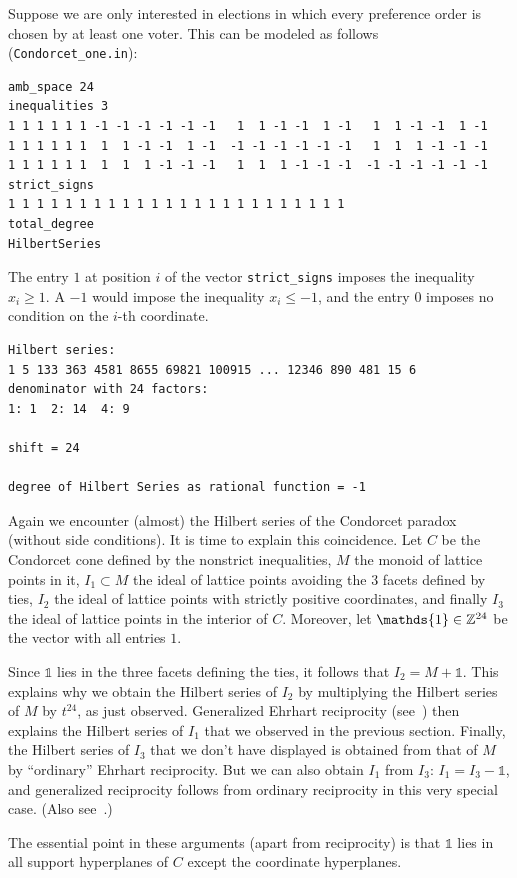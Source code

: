 Suppose we are only interested in elections in which every preference order is chosen by at least one voter. This can be modeled as follows (\verb|Condorcet_one.in|):
\begin{Verbatim}
amb_space 24
inequalities 3
1 1 1 1 1 1 -1 -1 -1 -1 -1 -1   1  1 -1 -1  1 -1   1  1 -1 -1  1 -1
1 1 1 1 1 1  1  1 -1 -1  1 -1  -1 -1 -1 -1 -1 -1   1  1  1 -1 -1 -1
1 1 1 1 1 1  1  1  1 -1 -1 -1   1  1  1 -1 -1 -1  -1 -1 -1 -1 -1 -1
strict_signs
1 1 1 1 1 1 1 1 1 1 1 1 1 1 1 1 1 1 1 1 1 1 1 1
total_degree
HilbertSeries
\end{Verbatim}
The entry $1$ at position $i$ of the vector \verb|strict_signs| imposes the inequality $x_i\ge1$. A $-1$ would impose the inequality $x_i\le -1$, and the entry $0$ imposes no condition on the $i$-th coordinate.

\begin{Verbatim}
Hilbert series:
1 5 133 363 4581 8655 69821 100915 ... 12346 890 481 15 6 
denominator with 24 factors:
1: 1  2: 14  4: 9  

shift = 24

degree of Hilbert Series as rational function = -1
\end{Verbatim}
Again we encounter (almost) the Hilbert series of the Condorcet paradox (without side conditions). It is time to explain this coincidence. Let $C$ be the Condorcet cone defined by the nonstrict inequalities, $M$ the monoid of lattice points in it, $I_1\subset M$ the ideal of lattice points avoiding the $3$ facets defined by ties, $I_2$ the ideal of lattice points with strictly positive coordinates, and finally $I_3$ the ideal of lattice points in the interior of $C$. Moreover, let $\mathds{1}\in\ZZ^{24}$ be the vector with all entries $1$.

Since $\mathds{1}$ lies in the three facets defining the ties, it follows that $I_2=M+\mathds{1}$. This explains why we obtain the Hilbert series of $I_2$ by multiplying the Hilbert series of $M$ by $t^{24}$, as just observed. Generalized Ehrhart reciprocity (see~\cite[Theorem~6.70]{BG}) then explains the Hilbert series of $I_1$ that we observed in the previous section. Finally, the Hilbert series of $I_3$ that we don't have displayed is obtained from that of $M$ by ``ordinary'' Ehrhart reciprocity. But we can also obtain $I_1$ from $I_3$: $I_1=I_3-\mathds{1}$, and generalized reciprocity follows from ordinary reciprocity in this very special case. (Also see~\cite{BIS2}.)

The essential point in these arguments (apart from reciprocity) is that $\mathds{1}$ lies in all support hyperplanes of $C$ except the coordinate hyperplanes.

